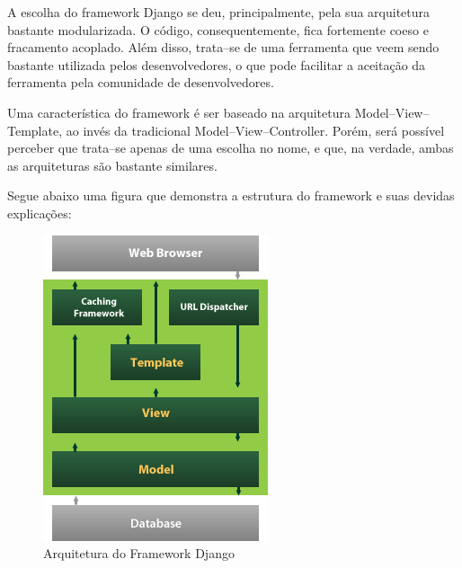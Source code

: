 \documentclass[graduacao,brazil]{ThesisPUC}
\begin{document}
A escolha do framework Django se deu, principalmente, pela sua arquitetura bastante modularizada.
O c\'{o}digo, consequentemente, fica fortemente coeso e fracamento acoplado. Al\'{e}m disso, trata--se
de uma ferramenta que veem sendo bastante utilizada pelos desenvolvedores, o que pode facilitar
a aceita\c{c}\~{a}o da ferramenta pela comunidade de desenvolvedores.

Uma caracter\'{i}stica do framework \'{e} ser baseado na arquitetura Model--View--Template, ao inv\'{e}s
da tradicional Model--View--Controller. Por\'{e}m, ser\'{a} poss\'{i}vel perceber que trata--se apenas de
uma escolha no nome, e que, na verdade, ambas as arquiteturas s\~{a}o bastante similares.

Segue abaixo uma figura que demonstra a estrutura do framework e suas devidas explica\c{c}\~{o}es:

\begin{figure}[H]
    \centering
    \includegraphics[width=\linewidth]{Imagens/django_structure.png}
    \caption{Arquitetura do Framework Django}
\end{figure}
\end{document}
